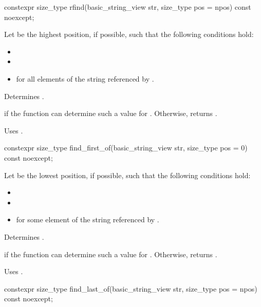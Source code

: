 %
\begin{itemdecl}
constexpr size_type rfind(basic_string_view str, size_type pos = npos) const noexcept;
\end{itemdecl}

\begin{itemdescr}
\pnum
Let  be the highest position, if possible, such that the following conditions hold:
\begin{itemize}
\item
{}
\item
{}
\item
{} for all elements  of the string referenced by .
\end{itemize}

\pnum
\effects
Determines .

\pnum
\returns
{} if the function can determine such a value for .
Otherwise, returns .

\pnum
\remarks
Uses .
\end{itemdescr}

%
\begin{itemdecl}
constexpr size_type find_first_of(basic_string_view str, size_type pos = 0) const noexcept;
\end{itemdecl}

\begin{itemdescr}
\pnum
Let  be the lowest position, if possible, such that the following conditions hold:
\begin{itemize}
\item
{}
\item
{}
\item
{} for some element  of the string referenced by .
\end{itemize}

\pnum
\effects
Determines .

\pnum
\returns
{} if the function can determine such a value for .
Otherwise, returns .

\pnum
\remarks
Uses .
\end{itemdescr}

%
\begin{itemdecl}
constexpr size_type find_last_of(basic_string_view str, size_type pos = npos) const noexcept;
\end{itemdecl}

